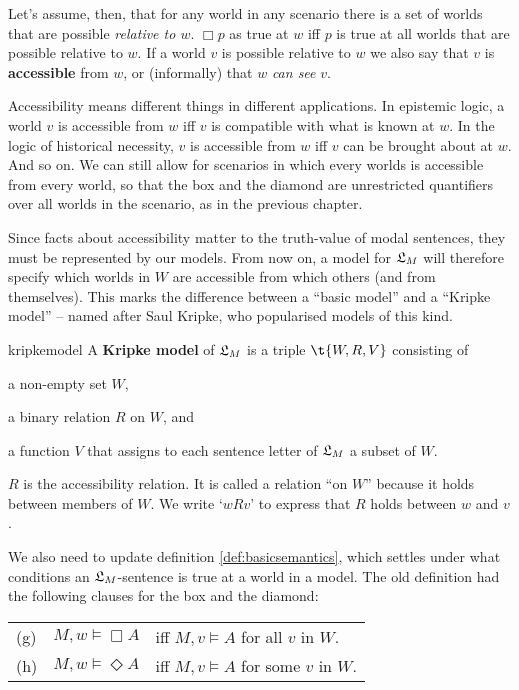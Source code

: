 Let's assume, then, that for any world in any scenario there is a set of worlds
that are possible \emph{relative to $w$}. $\Box p$ as true at $w$
iff $p$ is true at all worlds that are possible relative to $w$. If a world $v$
is possible relative to $w$ we also say that $v$ is \textbf{accessible} from $w$,
or (informally) that $w$ \emph{can see} $v$.

Accessibility means different things in different applications. In epistemic
logic, a world $v$ is accessible from $w$ iff $v$ is compatible with what is
known at $w$. In the logic of historical necessity, $v$ is accessible from $w$
iff $v$ can be brought about at $w$. And so on. We can still allow for scenarios
in which every worlds is accessible from every world, so that the box and the
diamond are unrestricted quantifiers over all worlds in the scenario, as in the
previous chapter.

Since facts about accessibility matter to the truth-value of modal sentences,
they must be represented by our models. From now on, a model for $\mathfrak{L}_M$ will
therefore specify which worlds in $W$ are accessible from which others (and from
themselves). This marks the difference between a ``basic model'' and a ``Kripke
model'' -- named after Saul Kripke, who popularised models of this kind.
%
% 
\begin{definition}{}{kripkemodel}
  A \textbf{Kripke model} of $\mathfrak{L}_M$ is a triple $\t{W,R,V}$ consisting of
  \vspace{-3mm}
  \begin{itemize*}
  \item a non-empty set $W$,
  \item a binary relation $R$ on $W$, and
  \item a function $V$ that assigns to each sentence letter of $\mathfrak{L}_M$
  a subset of $W$.
  \end{itemize*}
\end{definition}
%
\noindent%
$R$ is the accessibility relation. It is called a relation ``on $W$'' because it
holds between members of $W$. We write `$wRv$' to express that $R$ holds between
$w$ and $v$.

We also need to update definition \ref{def:basicsemantics}, which settles under
what conditions an $\mathfrak{L}_M$-sentence is true at a world in a model. The old
definition had the following clauses for the box and the diamond:

\bigskip
\begin{tabular}{lll}
  (g) & $M,w \models \Box A$ &iff $M,v \models A$ for all $v$ in $ W$.\\
  (h) & $M,w \models \Diamond A$ &iff $M,v \models A$ for some $v$ in $ W$.
\end{tabular}
\bigskip

